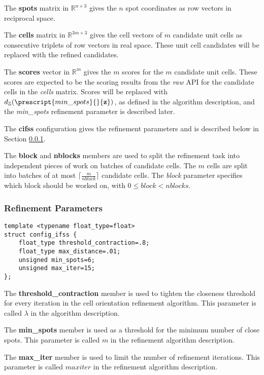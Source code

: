 \documentclass[a4paper,10pt]{article}
\newcommand{\vect}[1]{\mathbf{#1}}
\newcommand{\ceil}[1]{\lceil #1 \rceil}
\newcommand{\distZ}[1]{d_\mathbb{Z}(#1)}
\begin{document}
The \textbf{spots} matrix in $\mathbb{R}^{n\times 3}$ gives the $n$ spot coordinates as row vectors in reciprocal space.

The \textbf{cells} matrix in $\mathbb{R}^{3m\times 3}$ gives the cell vectors of $m$ candidate unit cells as consecutive triplets of row vectors in real space. These unit cell candidates will be replaced with the refined candidates.

The \textbf{scores} vector in $\mathbb{R}^m$ gives the $m$ scores for the $m$ candidate unit cells. These scores are expected to be the scoring results from the \emph{raw} API for the candidate cells in the \emph{cells} matrix. Scores will be replaced with $\distZ{\prescript{min\_spots}{}{\vect{z}}}$, as defined in the algorithm description, and the \emph{min\_spots} refinement parameter is described later.

The \textbf{cifss} configuration gives the refinement parameters and is described below in Section \ref{subsub:refparams}.

The \textbf{block} and \textbf{nblocks} members are used to split the refinement task into independent pieces of work on batches of candidate cells. The $m$ cells are split into batches of at most $\ceil{\frac{m}{nblock}}$ candidate cells. The \emph{block} parameter specifies which block should be worked on, with $0\leq block < nblocks$.

\subsubsection{Refinement Parameters}\label{subsub:refparams}

\begin{lstlisting}
template <typename float_type=float>
struct config_ifss {
    float_type threshold_contraction=.8;
    float_type max_distance=.01;
    unsigned min_spots=6;
    unsigned max_iter=15;
};
\end{lstlisting}

The \textbf{threshold\_contraction} member is used to tighten the closeness threshold for every iteration in the cell orientation refinement algorithm. This parameter is called $\lambda$ in the algorithm description.

The \textbf{min\_spots} member is used as a threshold for the minimum number of close spots. This parameter is called $m$ in the refinement algorithm description.

The \textbf{max\_iter} member is used to limit the number of refinement iterations. This parameter is called $maxiter$ in the refinement algorithm description.
\end{document}
